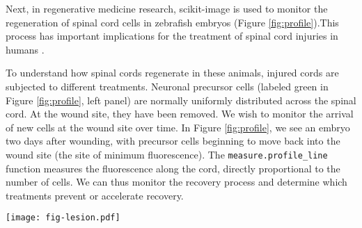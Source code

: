     Next, in regenerative medicine research, scikit-image is used to monitor the regeneration of spinal cord cells in zebrafish embryos (Figure \ref{fig:profile}).This process has important implications for the treatment of spinal cord injuries in humans \citep{Bhatt04,Thuret06}.

    To understand how spinal cords regenerate in these animals, injured cords are subjected to different treatments. Neuronal precursor cells (labeled green in Figure \ref{fig:profile}, left panel) are normally uniformly distributed across the spinal cord. At the wound site, they have been removed. We wish to monitor the arrival of new cells at the wound site over time. In Figure \ref{fig:profile}, we see an embryo two days after wounding, with precursor cells beginning to move back into the wound site (the site of minimum fluorescence). The \texttt{measure.profile\_line} function measures the fluorescence along the cord, directly proportional to the number of cells. We can thus monitor the recovery process and determine which treatments prevent or accelerate recovery.

    \begin{figure*}[bht]

      \texttt{[image: fig-lesion.pdf]}

      \caption{The \texttt{measure.profile\_line} function being used to track recovery in spinal cord injuries. \textit{Left}: an image of fluorescently-labeled nerve cells in an injured zebrafish embryo. \textit{Middle}: the automatically determined region of interest. The SciPy library was used to determine the region extent \citep{scipy,scipylib}, and functions from the scikit-image \texttt{draw} module were used to draw it. \textit{Right}: the image intensity along the line of interest, averaged over the displayed width. \label{fig:profile}}
    \end{figure*}
